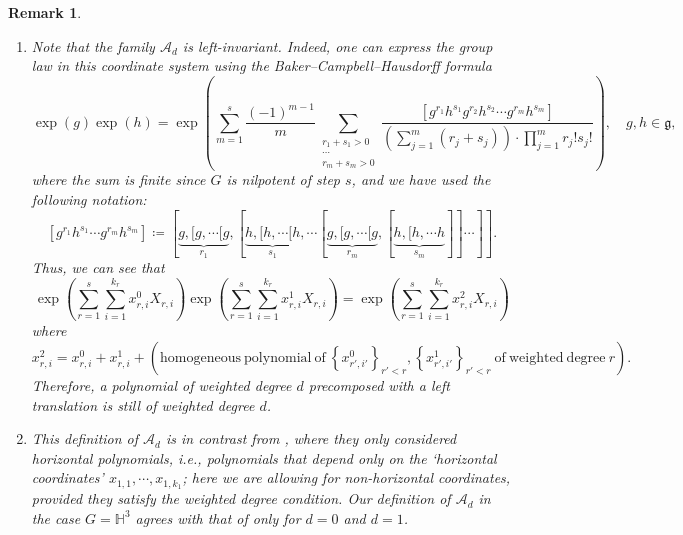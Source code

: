 \documentclass[11pt,reqno]{amsart}
\newtheorem{remark}[theorem]{Remark}
\newcommand{\1}{\mathbf 1}
\begin{document}
\begin{remark}\,
\begin{enumerate}
\item Note that the family $\mathcal{A}_d$ is left-invariant. Indeed, one can express the group law in this coordinate system using the Baker--Campbell--Hausdorff formula
\[
\exp\left(g\right)\exp\left(h\right) =\exp\left(
\sum_{m = 1}^s\frac {\left(-1\right)^{m-1}}{m}
\sum_{\begin{smallmatrix} r_1 + s_1 > 0  \\\cdots \\ r_m + s_m > 0 \end{smallmatrix}}
\frac{\left[ g^{r_1} h^{s_1} g^{r_2} h^{s_2} \dotsm g^{r_m} h^{s_m} \right]}{\left(\sum_{j = 1}^m \left(r_j + s_j\right)\right) \cdot \prod_{j = 1}^m r_j! s_j!}\right),\quad g,h\in \mathfrak{g},
\]
where the sum is finite since $G$ is nilpotent of step $s$, and we have used the following notation:
\[
\left[ g^{r_1} h^{s_1} \dotsm g^{r_m} h^{s_m} \right] \coloneqq [ \underbrace{g,[g,\dotsm[g}_{r_1} ,[ \underbrace{h,[h,\dotsm[h}_{s_1} ,\dotsm [ \underbrace{g,[g,\dotsm[g}_{r_m} ,[ \underbrace{h,[h,\dotsm h}_{s_m} ]]\dotsm]].
\]
Thus, we can see that
\begin{equation}\label{eq:grouplaw1}
\exp\left(\sum_{r=1}^s\sum_{i=1}^{k_r}x^0_{r,i} X_{r,i}\right)\exp\left(\sum_{r=1}^s\sum_{i=1}^{k_r}x^1_{r,i} X_{r,i}\right)=\exp\left(\sum_{r=1}^s\sum_{i=1}^{k_r}x^2_{r,i} X_{r,i}\right)
\end{equation}
where
\begin{equation}\label{eq:grouplaw2}
x^2_{r,i}=x^0_{r,i}+x^1_{r,i}+\left(\mathrm{homogeneous~ polynomial ~of~ }\left\{x^0_{r',i'}\right\}_{r'<r},\left\{x^1_{r',i'}\right\}_{r'<r}\mathrm{~of~ weighted~ degree~ }r\right).
\end{equation}
Therefore, a polynomial of weighted degree $d$ precomposed with a left translation is still of weighted degree $d$.

\item This definition of $\mathcal{A}_d$ is in contrast from \cite{fassler2020dorronsoro}, where they only considered horizontal polynomials, i.e., polynomials that depend only on the `horizontal coordinates' $x_{1,1},\cdots,x_{1,k_1}$; here we are allowing for non-horizontal coordinates, provided they satisfy the weighted degree condition. Our definition of $\mathcal{A}_d$ in the case $G=\mathbb{H}^3$ agrees with that of \cite{fassler2020dorronsoro} only for $d=0$ and $d=1$.
\end{enumerate}
\end{remark}
\end{document}
